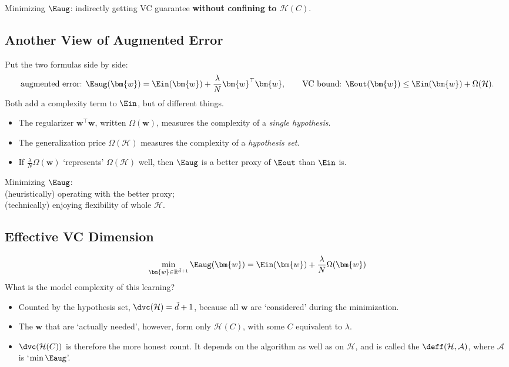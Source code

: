 \begin{moral}
    Minimizing \(\Eaug\): indirectly getting VC guarantee \textbf{without
    confining to \(\mathcal{H}(C)\)}.
\end{moral}

\subsection{Another View of Augmented Error}

Put the two formulas side by side:
\[
    \text{augmented error: } \Eaug(\bm{w}) = \Ein(\bm{w}) + \frac{\lambda}{N}
    \bm{w}^\top \bm{w} ,
    \qquad
    \text{VC bound: } \Eout(\bm{w}) \le \Ein(\bm{w}) + \Omega(\mathcal{H}) .
\]
Both add a complexity term to \(\Ein\), but of different things.
\begin{itemize}
    \item The regularizer \(\bm{w}^\top \bm{w}\), written \(\Omega(\bm{w})\),
        measures the complexity of a \emph{single hypothesis}.
    \item The generalization price \(\Omega(\mathcal{H})\) measures the
        complexity of a \emph{hypothesis set}.
    \item If \(\frac{\lambda}{N} \Omega(\bm{w})\) `represents'
        \(\Omega(\mathcal{H})\) well, then \(\Eaug\) is a better proxy of
        \(\Eout\) than \(\Ein\) is.
\end{itemize}

\begin{moral}
    Minimizing \(\Eaug\):\\
    (heuristically) operating with the better proxy;\\
    (technically) enjoying flexibility of whole \(\mathcal{H}\).
\end{moral}

\subsection{Effective VC Dimension}

\[
    \min_{\bm{w} \in \mathbb{R}^{\tilde{d}+1}} \Eaug(\bm{w}) = \Ein(\bm{w}) +
    \frac{\lambda}{N} \Omega(\bm{w})
\]
What is the model complexity of this learning?
\begin{itemize}
    \item Counted by the hypothesis set, \(\dvc(\mathcal{H}) = \tilde{d} + 1\),
        because all \(\bm{w}\) are `considered' during the minimization.
    \item The \(\bm{w}\) that are `actually needed', however, form only
        \(\mathcal{H}(C)\), with some \(C\) equivalent to \(\lambda\).
    \item \(\dvc(\mathcal{H}(C))\) is therefore the more honest count. It
        depends on the algorithm as well as on \(\mathcal{H}\), and is called
        the  \(\deff(\mathcal{H},
        \mathcal{A})\), where \(\mathcal{A}\) is `\(\min \Eaug\)'.
\end{itemize}

